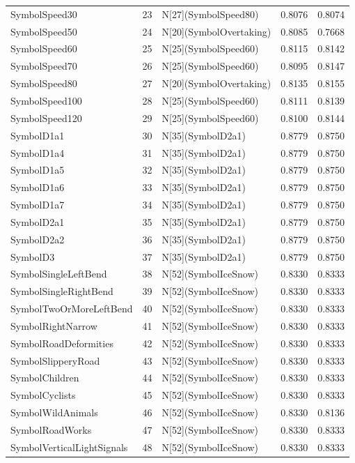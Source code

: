 \begin{table}[t]
\begin{tabular}{lllll}
SymbolSpeed30 & 23 & N[27](SymbolSpeed80) & 0.8076 & 0.8074 \\
SymbolSpeed50 & 24 & N[20](SymbolOvertaking) & 0.8085 & 0.7668 \\
SymbolSpeed60 & 25 & N[25](SymbolSpeed60) & 0.8115 & 0.8142 \\
SymbolSpeed70 & 26 & N[25](SymbolSpeed60) & 0.8095 & 0.8147 \\
SymbolSpeed80 & 27 & N[20](SymbolOvertaking) & 0.8135 & 0.8155 \\
SymbolSpeed100 & 28 & N[25](SymbolSpeed60) & 0.8111 & 0.8139 \\
SymbolSpeed120 & 29 & N[25](SymbolSpeed60) & 0.8100 & 0.8144 \\
SymbolD1a1 & 30 & N[35](SymbolD2a1) & 0.8779 & 0.8750 \\
SymbolD1a4 & 31 & N[35](SymbolD2a1) & 0.8779 & 0.8750 \\
SymbolD1a5 & 32 & N[35](SymbolD2a1) & 0.8779 & 0.8750 \\
SymbolD1a6 & 33 & N[35](SymbolD2a1) & 0.8779 & 0.8750 \\
SymbolD1a7 & 34 & N[35](SymbolD2a1) & 0.8779 & 0.8750 \\
SymbolD2a1 & 35 & N[35](SymbolD2a1) & 0.8779 & 0.8750 \\
SymbolD2a2 & 36 & N[35](SymbolD2a1) & 0.8779 & 0.8750 \\
SymbolD3 & 37 & N[35](SymbolD2a1) & 0.8779 & 0.8750 \\
SymbolSingleLeftBend & 38 & N[52](SymbolIceSnow) & 0.8330 & 0.8333 \\
SymbolSingleRightBend & 39 & N[52](SymbolIceSnow) & 0.8330 & 0.8333 \\
SymbolTwoOrMoreLeftBend & 40 & N[52](SymbolIceSnow) & 0.8330 & 0.8333 \\
SymbolRightNarrow & 41 & N[52](SymbolIceSnow) & 0.8330 & 0.8333 \\
SymbolRoadDeformities & 42 & N[52](SymbolIceSnow) & 0.8330 & 0.8333 \\
SymbolSlipperyRoad & 43 & N[52](SymbolIceSnow) & 0.8330 & 0.8333 \\
SymbolChildren & 44 & N[52](SymbolIceSnow) & 0.8330 & 0.8333 \\
SymbolCyclists & 45 & N[52](SymbolIceSnow) & 0.8330 & 0.8333 \\
SymbolWildAnimals & 46 & N[52](SymbolIceSnow) & 0.8330 & 0.8136 \\
SymbolRoadWorks & 47 & N[52](SymbolIceSnow) & 0.8330 & 0.8333 \\
SymbolVerticalLightSignals & 48 & N[52](SymbolIceSnow) & 0.8330 & 0.8333 \\

\end{tabular}
\end{table}
